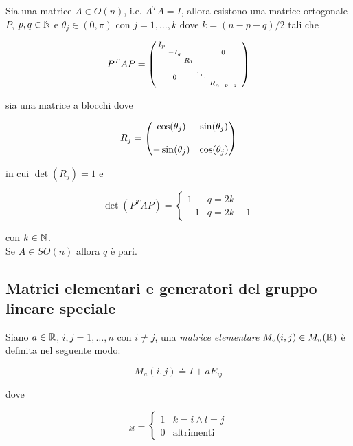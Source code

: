 \begin{theorem}
	Sia una matrice $ A \in O(n) $, i.e. $ A^{T} A = I $, allora esistono una matrice ortogonale $ P $, $ p,q \in \mathbb{N} $ e $ \theta_{j} \in (0,\pi) $ con $ j=1,\dots,k $ dove $ k = (n-p-q)/2 $ tali che
	
	\begin{equation}
		P^{T} A P = %
		\smqty(\dmat{ I_{p} & & & & & \\ & - I_{q} & & & 0 & \\ & & R_{1} & & & \\ & 0 & & \ddots & \\ & & & & R_{n-p-q} })
	\end{equation}

	sia una matrice a blocchi dove
	
	\begin{equation}
		R_{j} = \mqty(\dmat{ \cos(\theta_{j}) & \sin(\theta_{j}) \\\\ - \sin(\theta_{j}) & \cos(\theta_{j}) })
	\end{equation}

	in cui $ \det(R_{j}) = 1 $ e
	
	\begin{equation}
		\det(P^{T} A P) = %
		\begin{cases}
			1 & q = 2 k\\
			- 1 & q = 2 k + 1
		\end{cases}
	\end{equation}

	con $ k \in \mathbb{N} $.\\
	Se $ A \in SO(n) $ allora $ q $ è pari.
\end{theorem}

\subsection{Matrici elementari e generatori del gruppo lineare speciale}

Siano $ a \in \mathbb{R} $, $ i,j=1,\dots,n $ con $ i \neq j $, una \textit{matrice elementare} $ M_{a}(i,j) \in M_{n}(\mathbb{R}) $ è definita nel seguente modo:

\begin{equation}
	M_{a}(i,j) \doteq I + a E_{ij}
\end{equation}

dove

\begin{equation}
	[E_{ij}]_{kl} = %
	\begin{cases}
		1 & k = i \wedge l = j\\
		0 & \text{altrimenti}
	\end{cases}
\end{equation}

